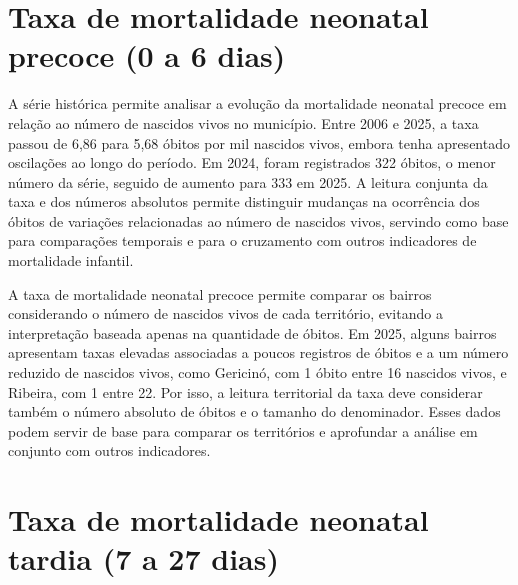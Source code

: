 \section{Taxa de mortalidade neonatal precoce (0 a 6 dias)}


A série histórica permite analisar a evolução da mortalidade neonatal precoce em relação ao número de nascidos vivos no município. Entre 2006 e 2025, a taxa passou de 6,86 para 5,68 óbitos por mil nascidos vivos, embora tenha apresentado oscilações ao longo do período. Em 2024, foram registrados 322 óbitos, o menor número da série, seguido de aumento para 333 em 2025. A leitura conjunta da taxa e dos números absolutos permite distinguir mudanças na ocorrência dos óbitos de variações relacionadas ao número de nascidos vivos, servindo como base para comparações temporais e para o cruzamento com outros indicadores de mortalidade infantil.


A taxa de mortalidade neonatal precoce permite comparar os bairros considerando o número de nascidos vivos de cada território, evitando a interpretação baseada apenas na quantidade de óbitos. Em 2025, alguns bairros apresentam taxas elevadas associadas a poucos registros de óbitos e a um número reduzido de nascidos vivos, como Gericinó, com 1 óbito entre 16 nascidos vivos, e Ribeira, com 1 entre 22. Por isso, a leitura territorial da taxa deve considerar também o número absoluto de óbitos e o tamanho do denominador. Esses dados podem servir de base para comparar os territórios e aprofundar a análise em conjunto com outros indicadores.


\section{Taxa de mortalidade neonatal tardia (7 a 27 dias)}

